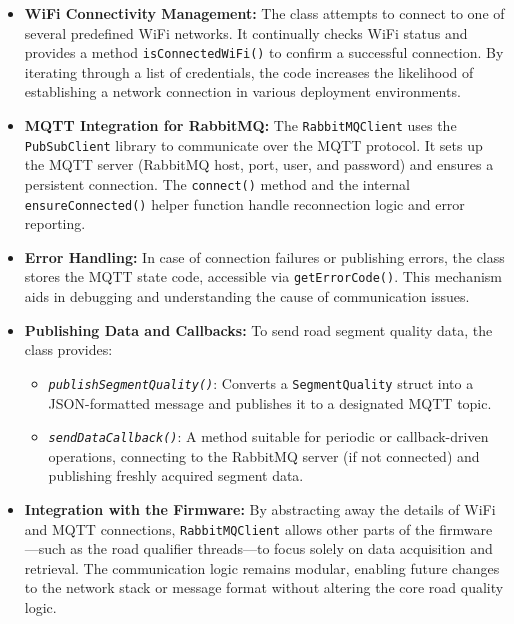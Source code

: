 \begin{itemize}
    \item \textbf{WiFi Connectivity Management:}  
    The class attempts to connect to one of several predefined WiFi networks. It continually checks WiFi status and provides a method \texttt{isConnectedWiFi()} to confirm a successful connection. By iterating through a list of credentials, the code increases the likelihood of establishing a network connection in various deployment environments.

    \item \textbf{MQTT Integration for RabbitMQ:}  
    The \texttt{RabbitMQClient} uses the \texttt{PubSubClient} library to communicate over the MQTT protocol. It sets up the MQTT server (RabbitMQ host, port, user, and password) and ensures a persistent connection. The \texttt{connect()} method and the internal \texttt{ensureConnected()} helper function handle reconnection logic and error reporting.

    \item \textbf{Error Handling:}  
    In case of connection failures or publishing errors, the class stores the MQTT state code, accessible via \texttt{getErrorCode()}. This mechanism aids in debugging and understanding the cause of communication issues.

    \item \textbf{Publishing Data and Callbacks:}  
    To send road segment quality data, the class provides:
    \begin{itemize}
        \item \textit{\texttt{publishSegmentQuality()}}: Converts a \texttt{SegmentQuality} struct into a JSON-formatted message and publishes it to a designated MQTT topic.
        \item \textit{\texttt{sendDataCallback()}}: A method suitable for periodic or callback-driven operations, connecting to the RabbitMQ server (if not connected) and publishing freshly acquired segment data.
    \end{itemize}

    \item \textbf{Integration with the Firmware:}  
    By abstracting away the details of WiFi and MQTT connections, \texttt{RabbitMQClient} allows other parts of the firmware—such as the road qualifier threads—to focus solely on data acquisition and retrieval. The communication logic remains modular, enabling future changes to the network stack or message format without altering the core road quality logic.

\end{itemize}

